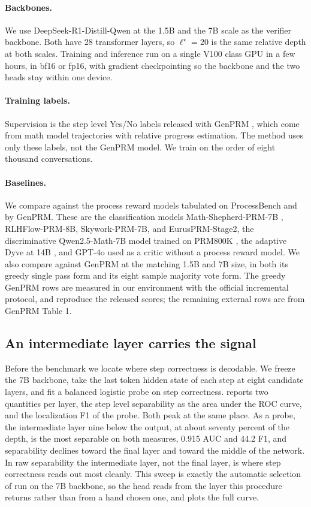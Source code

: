\paragraph{Backbones.} We use DeepSeek-R1-Distill-Qwen at the 1.5B and the 7B scale as the verifier backbone. Both have 28 transformer layers, so $\ell^\star=20$ is the same relative depth at both scales. Training and inference run on a single V100 class GPU in a few hours, in bf16 or fp16, with gradient checkpointing so the backbone and the two heads stay within one device.

\paragraph{Training labels.} Supervision is the step level Yes/No labels released with GenPRM \citep{zhao2025genprm}, which come from math model trajectories with relative progress estimation. The method uses only these labels, not the GenPRM model. We train on the order of eight thousand conversations.

\paragraph{Baselines.} We compare against the process reward models tabulated on ProcessBench and by GenPRM. These are the classification models Math-Shepherd-PRM-7B \citep{wang2023mathshepherd}, RLHFlow-PRM-8B, Skywork-PRM-7B, and EurusPRM-Stage2, the discriminative Qwen2.5-Math-7B model trained on PRM800K \citep{lightman2023lets, zhang2025lessons}, the adaptive Dyve at 14B \citep{zhong2025dyve}, and GPT-4o used as a critic without a process reward model. We also compare against GenPRM at the matching 1.5B and 7B size, in both its greedy single pass form and its eight sample majority vote form. The greedy GenPRM rows are measured in our environment with the official incremental protocol, and reproduce the released scores; the remaining external rows are from GenPRM Table 1.

\subsection{An intermediate layer carries the signal}
\label{sec:exp-layer}

Before the benchmark we locate where step correctness is decodable. We freeze the 7B backbone, take the last token hidden state of each step at eight candidate layers, and fit a balanced logistic probe on step correctness.  reports two quantities per layer, the step level separability as the area under the ROC curve, and the localization F1 of the probe. Both peak at the same place. As a probe, the intermediate layer nine below the output, at about seventy percent of the depth, is the most separable on both measures, 0.915 AUC and 44.2 F1, and separability declines toward the final layer and toward the middle of the network. In raw separability the intermediate layer, not the final layer, is where step correctness reads out most cleanly. This sweep is exactly the automatic selection of  run on the 7B backbone, so the head reads from the layer this procedure returns rather than from a hand chosen one, and  plots the full curve.

